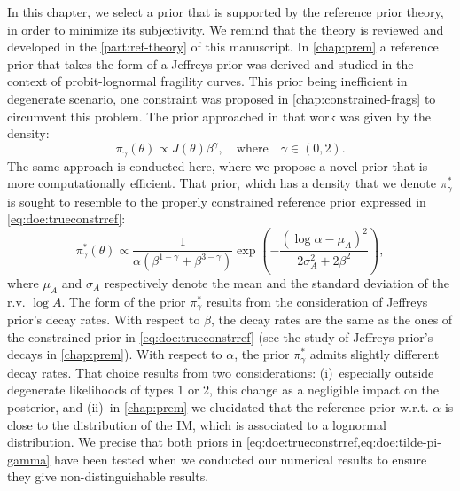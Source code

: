 In this chapter, we select a prior that is supported by the reference prior theory, in order to minimize its subjectivity.
We remind that the theory is reviewed and developed in the \cref{part:ref-theory} of this manuscript. %
In \cref{chap:prem} a reference prior that takes the form of a Jeffreys prior was derived and studied in the context of probit-lognormal fragility curves.
This prior being inefficient in degenerate scenario, one constraint was proposed in \cref{chap:constrained-frags} to circumvent this problem.
The prior approached in that work was given by the density:
    \begin{equation}\label{eq:doe:trueconstrref}
        \pi_\gamma(\theta)\propto J(\theta)\beta^\gamma,\quad\text{where}\quad \gamma\in(0,2).
    \end{equation}
The same approach is conducted here, where we propose a novel prior that is more computationally efficient.
That prior, which has a density that we denote $\pi^\ast_\gamma$ is sought to resemble to the properly constrained reference prior expressed in \cref{eq:doe:trueconstrref}:
    \begin{equation}\label{eq:doe:tilde-pi-gamma}
        \pi^\ast_\gamma(\theta) \propto\frac{1}{\alpha(\beta^{1-\gamma}+\beta^{3-\gamma})}\exp\left(-\frac{(\log\alpha-\mu_A)^2}{2\sigma_A^2+2\beta^2}\right),
    \end{equation}
    where $\mu_A$ and $\sigma_A$ respectively denote the mean and the standard deviation of the r.v. $\log A$.
The form of the prior $\pi^\ast_\gamma$ results from the consideration of Jeffreys prior's decay rates. With respect to $\beta$, the decay rates are the same as the ones of the constrained prior in \cref{eq:doe:trueconstrref} (see the study of Jeffreys prior's decays in \cref{chap:prem}). With respect to $\alpha$, the prior $\pi^\ast_\gamma$ admits slightly different decay rates. That choice results from two considerations: (i)~especially outside degenerate likelihoods of types 1 or 2, this change as a negligible impact on the posterior, and (ii)~in \cref{chap:prem} we elucidated that the reference prior w.r.t. $\alpha$ is close to the distribution of the IM, which is associated to a lognormal distribution.
We precise that both priors in \cref{eq:doe:trueconstrref,eq:doe:tilde-pi-gamma} have been tested when we conducted our numerical results to ensure they give non-distinguishable results.

